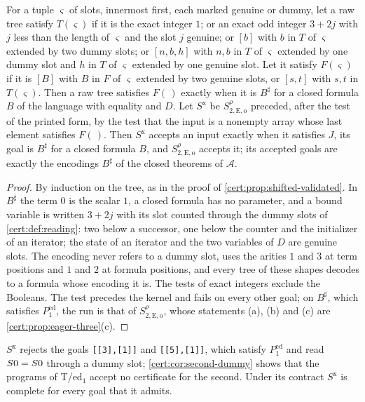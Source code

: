 \begin{proposition}\label{cert:prop:exact-image}
For a tuple $\varsigma$ of slots, innermost first, each marked genuine or dummy, let a
raw tree satisfy $T(\varsigma)$ if it is the exact integer $1$; or an exact odd integer
$3+2j$ with $j$ less than the length of $\varsigma$ and the slot $j$ genuine; or $[b]$
with $b$ in $T$ of $\varsigma$ extended by two dummy slots; or $[n,b,h]$ with $n,b$ in
$T$ of $\varsigma$ extended by one dummy slot and $h$ in $T$ of $\varsigma$ extended by
one genuine slot. Let it satisfy $F(\varsigma)$ if it is $[B]$ with $B$ in $F$ of
$\varsigma$ extended by two genuine slots, or $[s,t]$ with $s,t$ in $T(\varsigma)$. Then
a raw tree satisfies $F(\,)$ exactly when it is $B^{\sharp}$ for a closed formula $B$
of the language with equality and $D$. Let $S^{\mathrm x}$ be
$S^{\rho}_{2,\mathrm{E,o}}$ preceded, after the test of the printed form, by the test
that the input is a nonempty array whose last element satisfies $F(\,)$. Then
$S^{\mathrm x}$ accepts an input exactly when it satisfies $J$, its goal is $B^{\sharp}$
for a closed formula $B$, and $S^{\rho}_{2,\mathrm{E,o}}$ accepts it; its accepted goals
are exactly the encodings $B^{\sharp}$ of the closed theorems of $\mathcal A$.
\end{proposition}
\begin{proof}
By induction on the tree, as in the proof of \cref{cert:prop:shifted-validated}. In
$B^{\sharp}$ the term $0$ is the scalar $1$, a closed formula has no parameter, and a
bound variable is written $3+2j$ with its slot counted through the dummy slots of
\cref{cert:def:reading}: two below a successor, one below the counter and the
initializer of an iterator; the state of an iterator and the two variables of $D$ are
genuine slots. The encoding never refers to a dummy slot, uses the arities $1$ and $3$
at term positions and $1$ and $2$ at formula positions, and every tree of these shapes
decodes to a formula whose encoding it is. The tests of exact integers exclude the
Booleans. The test precedes the kernel and fails on every other goal; on $B^{\sharp}$,
which satisfies $P^{\mathrm{ed}}_{1}$, the run is that of $S^{\rho}_{2,\mathrm{E,o}}$,
whose statements (a), (b) and (c) are \cref{cert:prop:eager-three}(c).
\end{proof}

$S^{\mathrm x}$ rejects the goals \texttt{[[3],[1]]} and \texttt{[[5],[1]]}, which
satisfy $P^{\mathrm{ed}}_{1}$ and read $S 0=S 0$ through a dummy slot;
\cref{cert:cor:second-dummy} shows that the programs of T/ed$_1$ accept no certificate
for the second. Under its contract $S^{\mathrm x}$ is complete for every goal that it
admits.

